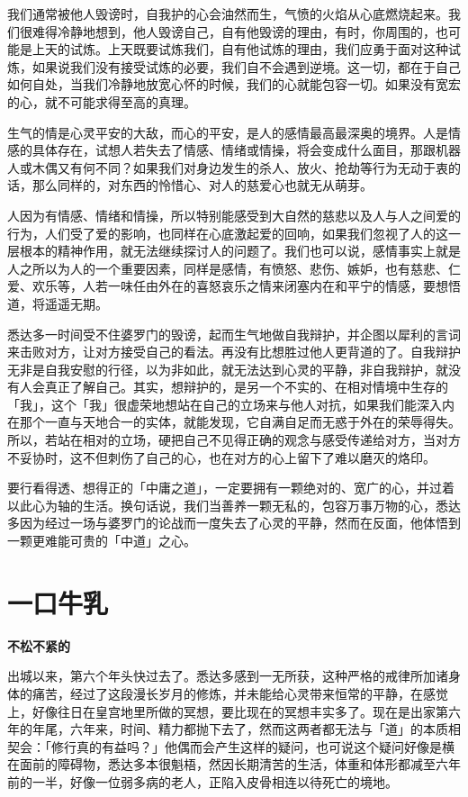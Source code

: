 \documentclass[twoside,openany]{book}
\newcommand{\mt}[1]{\textbullet \textbf{#1}}
\begin{document}
我们通常被他人毁谤时，自我护的心会油然而生，气愤的火焰从心底燃烧起来。我们很难得冷静地想到，他人毁谤自己，自有他毁谤的理由，有时，你周围的，也可能是上天的试炼。上天既要试炼我们，自有他试炼的理由，我们应勇于面对这种试炼，如果说我们没有接受试炼的必要，我们自不会遇到逆境。这一切，都在于自己如何自处，当我们冷静地放宽心怀的时候，我们的心就能包容一切。如果没有宽宏的心，就不可能求得至高的真理。

生气的情是心灵平安的大敌，而心的平安，是人的感情最高最深奥的境界。人是情感的具体存在，试想人若失去了情感、情绪或情操，将会变成什么面目，那跟机器人或木偶又有何不同？如果我们对身边发生的杀人、放火、抢劫等行为无动于衷的话，那么同样的，对东西的怜惜心、对人的慈爱心也就无从萌芽。

人因为有情感、情绪和情操，所以特别能感受到大自然的慈悲以及人与人之间爱的行为，人们受了爱的影响，也同样在心底激起爱的回响，如果我们忽视了人的这一层根本的精神作用，就无法继续探讨人的问题了。我们也可以说，感情事实上就是人之所以为人的一个重要因素，同样是感情，有愤怒、悲伤、嫉妒，也有慈悲、仁爱、欢乐等，人若一味任由外在的喜怒哀乐之情来闭塞内在和平宁的情感，要想悟道，将遥遥无期。

悉达多一时间受不住婆罗门的毁谤，起而生气地做自我辩护，并企图以犀利的言词来击败对方，让对方接受自己的看法。再没有比想胜过他人更背道的了。自我辩护无非是自我安慰的行径，以为非如此，就无法达到心灵的平静，非自我辩护，就没有人会真正了解自己。其实，想辩护的，是另一个不实的、在相对情境中生存的「我」，这个「我」很虚荣地想站在自己的立场来与他人对抗，如果我们能深入内在那个一直与天地合一的实体，就能发现，它自满自足而无惑于外在的荣辱得失。所以，若站在相对的立场，硬把自己不见得正确的观念与感受传递给对方，当对方不妥协时，这不但刺伤了自己的心，也在对方的心上留下了难以磨灭的烙印。

要行看得透、想得正的「中庸之道」，一定要拥有一颗绝对的、宽广的心，并过着以此心为轴的生活。换句话说，我们当善养一颗无私的，包容万事万物的心，悉达多因为经过一场与婆罗门的论战而一度失去了心灵的平静，然而在反面，他体悟到一颗更难能可贵的「中道」之心。

\section{一口牛乳}\label{sec1.9}

\mt{不松不紧的}

出城以来，第六个年头快过去了。悉达多感到一无所获，这种严格的戒律所加诸身体的痛苦，经过了这段漫长岁月的修炼，并未能给心灵带来恒常的平静，在感觉上，好像往日在皇宫地里所做的冥想，要比现在的冥想丰实多了。现在是出家第六年的年尾，六年来，时间、精力都抛下去了，然而这两者都无法与「道」的本质相契会：「修行真的有益吗？」他偶而会产生这样的疑问，也可说这个疑问好像是横在面前的障碍物，悉达多本很魁梧，然因长期清苦的生活，体重和体形都减至六年前的一半，好像一位弱多病的老人，正陷入皮骨相连以待死亡的境地。
\end{document}
